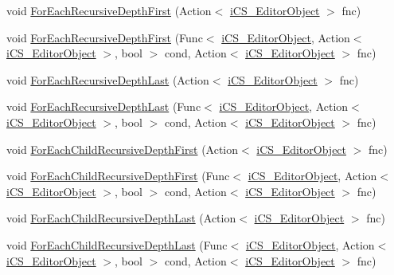 \begin{DoxyCompactItemize}
\item 
void \hyperlink{classi_c_s___editor_object_a873f5ea089c119801d66df5e10fffa3e}{For\+Each\+Recursive\+Depth\+First} (Action$<$ \hyperlink{classi_c_s___editor_object}{i\+C\+S\+\_\+\+Editor\+Object} $>$ fnc)
\item 
void \hyperlink{classi_c_s___editor_object_a58ecb0a3e0f9eeba0132890c880dd774}{For\+Each\+Recursive\+Depth\+First} (Func$<$ \hyperlink{classi_c_s___editor_object}{i\+C\+S\+\_\+\+Editor\+Object}, Action$<$ \hyperlink{classi_c_s___editor_object}{i\+C\+S\+\_\+\+Editor\+Object} $>$, bool $>$ cond, Action$<$ \hyperlink{classi_c_s___editor_object}{i\+C\+S\+\_\+\+Editor\+Object} $>$ fnc)
\item 
void \hyperlink{classi_c_s___editor_object_a91cb83131d9fdc9b0eeaa8fd0d5b9cd5}{For\+Each\+Recursive\+Depth\+Last} (Action$<$ \hyperlink{classi_c_s___editor_object}{i\+C\+S\+\_\+\+Editor\+Object} $>$ fnc)
\item 
void \hyperlink{classi_c_s___editor_object_ac55067e7ea52ba87ca32b1d2949ec359}{For\+Each\+Recursive\+Depth\+Last} (Func$<$ \hyperlink{classi_c_s___editor_object}{i\+C\+S\+\_\+\+Editor\+Object}, Action$<$ \hyperlink{classi_c_s___editor_object}{i\+C\+S\+\_\+\+Editor\+Object} $>$, bool $>$ cond, Action$<$ \hyperlink{classi_c_s___editor_object}{i\+C\+S\+\_\+\+Editor\+Object} $>$ fnc)
\item 
void \hyperlink{classi_c_s___editor_object_ac48139a8da09f3fb8e2503a0e35c79ce}{For\+Each\+Child\+Recursive\+Depth\+First} (Action$<$ \hyperlink{classi_c_s___editor_object}{i\+C\+S\+\_\+\+Editor\+Object} $>$ fnc)
\item 
void \hyperlink{classi_c_s___editor_object_a7f6f0943e8febfba69d28c0f847b1622}{For\+Each\+Child\+Recursive\+Depth\+First} (Func$<$ \hyperlink{classi_c_s___editor_object}{i\+C\+S\+\_\+\+Editor\+Object}, Action$<$ \hyperlink{classi_c_s___editor_object}{i\+C\+S\+\_\+\+Editor\+Object} $>$, bool $>$ cond, Action$<$ \hyperlink{classi_c_s___editor_object}{i\+C\+S\+\_\+\+Editor\+Object} $>$ fnc)
\item 
void \hyperlink{classi_c_s___editor_object_a205331331fe4eb41107a2f39db3e25ca}{For\+Each\+Child\+Recursive\+Depth\+Last} (Action$<$ \hyperlink{classi_c_s___editor_object}{i\+C\+S\+\_\+\+Editor\+Object} $>$ fnc)
\item 
void \hyperlink{classi_c_s___editor_object_aeee32648a54e74a39b89f99685b3e111}{For\+Each\+Child\+Recursive\+Depth\+Last} (Func$<$ \hyperlink{classi_c_s___editor_object}{i\+C\+S\+\_\+\+Editor\+Object}, Action$<$ \hyperlink{classi_c_s___editor_object}{i\+C\+S\+\_\+\+Editor\+Object} $>$, bool $>$ cond, Action$<$ \hyperlink{classi_c_s___editor_object}{i\+C\+S\+\_\+\+Editor\+Object} $>$ fnc)

\end{DoxyCompactItemize}
